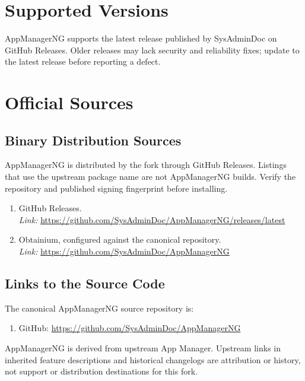 \section{Supported Versions}\label{sec:supported-versions} %
AppManagerNG supports the latest release published by SysAdminDoc on GitHub Releases. Older releases may lack security
and reliability fixes; update to the latest release before reporting a defect.


\section{Official Sources}\label{sec:official-sources} %

\subsection{Binary Distribution Sources}\label{subsec:binary-distribution-sources} %
AppManagerNG is distributed by the fork through GitHub Releases. Listings that use the upstream package name are not
AppManagerNG builds. Verify the repository and published signing fingerprint before installing.
\begin{enumerate}
    \item GitHub Releases.\\
    \textit{Link:} \url{https://github.com/SysAdminDoc/AppManagerNG/releases/latest}
    \item Obtainium, configured against the canonical repository.\\
    \textit{Link:} \url{https://github.com/SysAdminDoc/AppManagerNG}
\end{enumerate}

\subsection{Links to the Source Code}\label{subsec:links-to-source-code} %
The canonical AppManagerNG source repository is:
\begin{enumerate}
    \item GitHub: \url{https://github.com/SysAdminDoc/AppManagerNG}
\end{enumerate}
AppManagerNG is derived from upstream App Manager. Upstream links in inherited feature descriptions and historical
changelogs are attribution or history, not support or distribution destinations for this fork.

